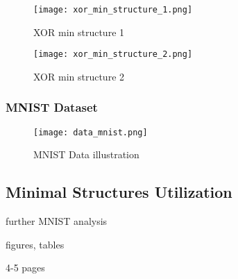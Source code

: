 \begin{figure}[H]
  \centering
  \texttt{[image: xor\_min\_structure\_1.png]}
  \caption{XOR min structure 1}
  \label{img:xor_min_structure_1}
\end{figure}

\begin{figure}[H]
  \centering
  \texttt{[image: xor\_min\_structure\_2.png]}
  \caption{XOR min structure 2}
  \label{img:xor_min_structure_2}
\end{figure}

\subsubsection*{MNIST Dataset}

\begin{figure}[H]
  \centering
  \texttt{[image: data\_mnist.png]}
  \caption{MNIST Data illustration}
  \label{img:data_mnist}
\end{figure}

\subsection{Minimal Structures Utilization}
further MNIST analysis

figures, tables

4-5 pages